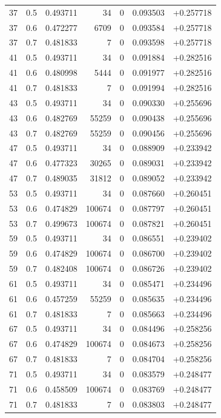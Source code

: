 \documentclass[11pt,reqno]{amsart}
\numberwithin{equation}{section}
\theoremstyle{plain}
\theoremstyle{definition}
\theoremstyle{remark}
\begin{document}
\begin{center}
\begin{longtable}{rrrrrrr}
37 & 0.5 & 0.493711 & 34 & 0 & 0.093503 & +0.257718\\
37 & 0.6 & 0.472277 & 6709 & 0 & 0.093584 & +0.257718\\
37 & 0.7 & 0.481833 & 7 & 0 & 0.093598 & +0.257718\\
41 & 0.5 & 0.493711 & 34 & 0 & 0.091884 & +0.282516\\
41 & 0.6 & 0.480998 & 5444 & 0 & 0.091977 & +0.282516\\
41 & 0.7 & 0.481833 & 7 & 0 & 0.091994 & +0.282516\\
43 & 0.5 & 0.493711 & 34 & 0 & 0.090330 & +0.255696\\
43 & 0.6 & 0.482769 & 55259 & 0 & 0.090438 & +0.255696\\
43 & 0.7 & 0.482769 & 55259 & 0 & 0.090456 & +0.255696\\
47 & 0.5 & 0.493711 & 34 & 0 & 0.088909 & +0.233942\\
47 & 0.6 & 0.477323 & 30265 & 0 & 0.089031 & +0.233942\\
47 & 0.7 & 0.489035 & 31812 & 0 & 0.089052 & +0.233942\\
53 & 0.5 & 0.493711 & 34 & 0 & 0.087660 & +0.260451\\
53 & 0.6 & 0.474829 & 100674 & 0 & 0.087797 & +0.260451\\
53 & 0.7 & 0.499673 & 100674 & 0 & 0.087821 & +0.260451\\
59 & 0.5 & 0.493711 & 34 & 0 & 0.086551 & +0.239402\\
59 & 0.6 & 0.474829 & 100674 & 0 & 0.086700 & +0.239402\\
59 & 0.7 & 0.482408 & 100674 & 0 & 0.086726 & +0.239402\\
61 & 0.5 & 0.493711 & 34 & 0 & 0.085471 & +0.234496\\
61 & 0.6 & 0.457259 & 55259 & 0 & 0.085635 & +0.234496\\
61 & 0.7 & 0.481833 & 7 & 0 & 0.085663 & +0.234496\\
67 & 0.5 & 0.493711 & 34 & 0 & 0.084496 & +0.258256\\
67 & 0.6 & 0.474829 & 100674 & 0 & 0.084673 & +0.258256\\
67 & 0.7 & 0.481833 & 7 & 0 & 0.084704 & +0.258256\\
71 & 0.5 & 0.493711 & 34 & 0 & 0.083579 & +0.248477\\
71 & 0.6 & 0.458509 & 100674 & 0 & 0.083769 & +0.248477\\
71 & 0.7 & 0.481833 & 7 & 0 & 0.083803 & +0.248477\\
\bottomrule
\end{longtable}
\end{center}
\end{document}
